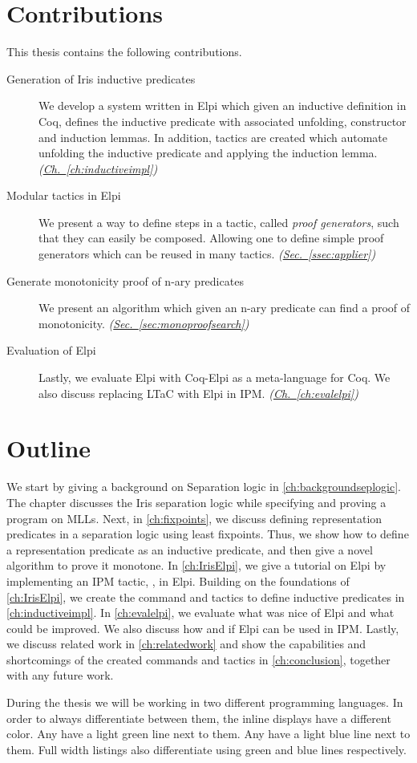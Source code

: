 \documentclass[thesis.tex]{subfiles}
\begin{document}
\section{Contributions}
This thesis contains the following contributions.
\begin{description}
  \item[Generation of Iris inductive predicates] We develop a system written in Elpi which given an inductive definition in Coq, defines the inductive predicate with associated unfolding, constructor and induction lemmas. In addition, tactics are created which automate unfolding the inductive predicate and applying the induction lemma. \emph{(\hyperref[ch:inductiveimpl]{Ch.~\ref*{ch:inductiveimpl}})}
  \item[Modular tactics in Elpi] We present a way to define steps in a tactic, called \emph{proof generators}, such that they can easily be composed. Allowing one to define simple proof generators which can be reused in many tactics. \emph{(\hyperref[ssec:applier]{Sec.~\ref*{ssec:applier}})}
  \item[Generate monotonicity proof of n-ary predicates] We present an algorithm which given an n-ary predicate can find a proof of monotonicity. \emph{(\hyperref[sec:monoproofsearch]{Sec.~\ref*{sec:monoproofsearch}})}
  \item[Evaluation of Elpi] Lastly, we evaluate Elpi with Coq-Elpi as a meta-language for Coq. We also discuss replacing LTaC with Elpi in IPM. \emph{(\hyperref[ch:evalelpi]{Ch.~\ref*{ch:evalelpi}})}
\end{description}

\section{Outline}
We start by giving a background on Separation logic in \cref{ch:backgroundseplogic}. The chapter discusses the Iris separation logic while specifying and proving a program on MLLs. Next, in \cref{ch:fixpoints}, we discuss defining representation predicates in a separation logic using least fixpoints. Thus, we show how to define a representation predicate as an inductive predicate, and then give a novel algorithm to prove it monotone. In \cref{ch:IrisElpi}, we give a tutorial on Elpi by implementing an IPM tactic, , in Elpi. Building on the foundations of \cref{ch:IrisElpi}, we create the command and tactics to define inductive predicates in \cref{ch:inductiveimpl}. In \cref{ch:evalelpi}, we evaluate what was nice of Elpi and what could be improved. We also discuss how and if Elpi can be used in IPM. Lastly, we discuss related work in \cref{ch:relatedwork} and show the capabilities and shortcomings of the created commands and tactics in \cref{ch:conclusion}, together with any future work.

During the thesis we will be working in two different programming languages. In order to always differentiate between them, the inline displays have a different color. Any  have a light green line next to them. Any  have a light blue line next to them. Full width listings also differentiate using green and blue lines respectively.
\end{document}
